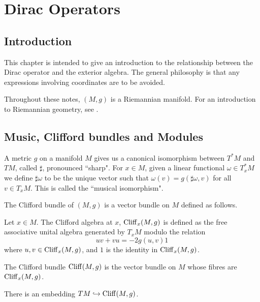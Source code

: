 
\chapter{Dirac Operators} %

\label{Dirac} %




\section{Introduction}
This chapter is intended to give an introduction to the relationship between
the Dirac operator and the exterior algebra. The general philosophy
is that any expressions involving coordinates are to be avoided.

Throughout these notes, $(M,g)$ is a Riemannian manifold. For
an introduction to Riemannian geometry, see \cite{diffGeom}.

\section{Music, Clifford bundles and Modules}
A metric $g$ on a manifold $M$ gives us a canonical isomorphism between $T^*M$
and $TM$, called $\sharp$, pronounced ``sharp". For $x \in M$, given a linear functional
$\omega \in T^*_xM$ we define $\sharp\omega$ to be the unique
vector such that $\omega(v) = g(\sharp\omega,v)$ for all $v \in T_xM$.
This is called the ``musical isomorphism".

The Clifford bundle of $(M,g)$ is a vector bundle on $M$ defined as follows.
\begin{definition}
    Let $x \in M$. The Clifford algebra at $x$, $\operatorname{Cliff}_x(M,g)$ is defined
    as the free associative unital algebra generated by $T_xM$ modulo the relation
    \begin{equation}
        uv+vu = -2g(u,v)1
    \end{equation}
    where $u,v \in \operatorname{Cliff}_x(M,g)$, and $1$ is the identity in $\operatorname{Cliff}_x(M,g)$.
    
    
    The Clifford bundle $\operatorname{Cliff}(M,g)$ is the vector bundle on $M$ whose fibres are 
    $\operatorname{Cliff}_x(M,g)$.
\end{definition}

There is an embedding $TM \hookrightarrow \operatorname{Cliff}(M,g)$. 

